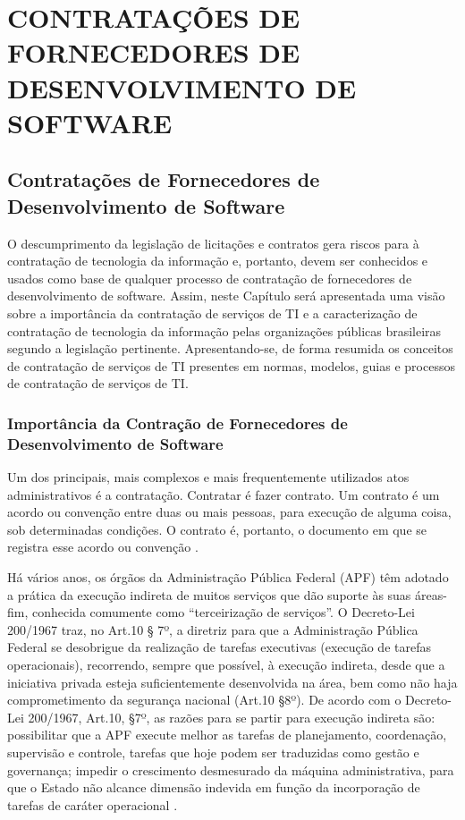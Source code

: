 \part{CONTRATAÇÕES DE FORNECEDORES DE DESENVOLVIMENTO DE SOFTWARE}

\chapter[Contratações de Fornecedores de Desenvolvimento de Software]{Contratações de Fornecedores de Desenvolvimento de Software}

O descumprimento da legislação de licitações e contratos gera riscos para à contratação de tecnologia da informação e, portanto, devem ser conhecidos e usados como base de qualquer processo de contratação de fornecedores de desenvolvimento de software. Assim, neste Capítulo será apresentada uma visão sobre a importância da contratação de serviços de TI e a caracterização de contratação de tecnologia da informação pelas organizações públicas brasileiras segundo a legislação pertinente. Apresentando-se, de forma resumida os conceitos de contratação de serviços de TI presentes em normas, modelos, guias e processos de contratação de serviços de TI.

\section[Importância da Contração de Fornecedores de Desenvolvimento de Software]{Importância da Contração de Fornecedores de Desenvolvimento de Software}

Um dos principais, mais complexos e mais frequentemente utilizados atos administrativos é a contratação. Contratar é fazer contrato. Um contrato é um acordo ou convenção entre duas ou mais pessoas, para execução de alguma coisa, sob determinadas condições. O contrato é, portanto, o documento em que se registra esse acordo ou convenção \cite{MPOG:2011}.

Há vários anos, os órgãos da Administração Pública Federal (APF) têm adotado a prática da execução indireta de muitos serviços que dão suporte às suas áreas-fim, conhecida comumente como “terceirização de serviços”. O Decreto-Lei 200/1967 traz, no Art.10 § 7º, a diretriz para que a Administração Pública Federal se desobrigue da realização de tarefas executivas (execução de tarefas operacionais), recorrendo, sempre que possível, à execução indireta, desde que a iniciativa privada esteja suficientemente desenvolvida na área, bem como não haja comprometimento da segurança nacional (Art.10 §8º). De acordo com o Decreto-Lei 200/1967, Art.10, §7º, as razões para se partir para execução indireta são: possibilitar que a APF execute melhor as tarefas de planejamento, coordenação, supervisão e controle, tarefas que hoje podem ser traduzidas como gestão e governança; impedir o crescimento desmesurado da máquina administrativa, para que o Estado não alcance dimensão indevida em função da incorporação de tarefas de caráter operacional  \cite{TCU:2012}. 

